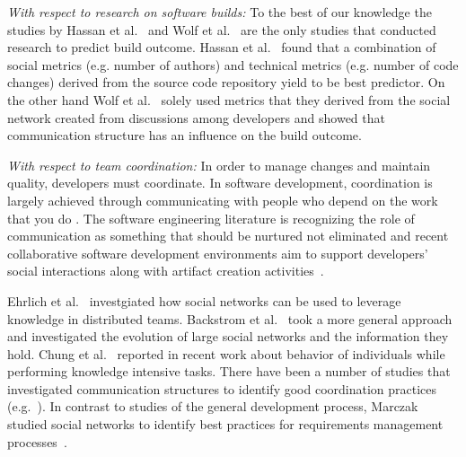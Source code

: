 \documentclass[12pt,oneside]{book}
\begin{document}
\emph{With respect to research on software builds:}
To the best of our knowledge the studies by Hassan et al.~\cite{hassan:ase:2006}
and Wolf et al.~\cite{wolf:icse:2009} are the only studies that conducted
research to predict build outcome. Hassan et al.~\cite{hassan:ase:2006} found
that a combination of social metrics (e.g. number of authors) and technical
metrics (e.g. number of code changes) derived from the source code repository
yield to be best predictor. On the other hand Wolf et al.~\cite{wolf:icse:2009}
solely used metrics that they derived from the social network created from
discussions among developers and showed that communication structure has an
influence on the build outcome.

\emph{With respect to team coordination:}
In
order to manage changes and maintain quality, developers must coordinate. In
software development, coordination is largely achieved through communicating with
people who depend on the work that you do \cite{kraut:1995coordination}. The
software engineering literature is recognizing the role of communication as
something that should be nurtured not eliminated and recent
collaborative software development environments aim to support developers'
social interactions along with artifact creation activities~\cite{nakakoji2010:rdc}.


Ehrlich et al.~\cite{ehrlich:icgse:2006} investgiated how social networks can be
used to leverage knowledge in distributed teams. Backstrom et
al.~\cite{backstrom:kdd:2006} took a more general approach and investigated the
evolution of large social networks and the information they hold. Chung et
al.~\cite{chung:cpr:07} reported in recent work about behavior of individuals
while performing knowledge intensive tasks. There have been a number of studies
that investigated communication structures to identify good
coordination practices
(e.g.~\cite{hinds:cscw:2006,hossain:cscw:2006,bird:fse:2008,hinds:hicss:2008}). In contrast to studies of the general development process, Marczak studied social
networks to identify best practices for requirements management
processes~\cite{marczak:re:2008}.
\end{document}
